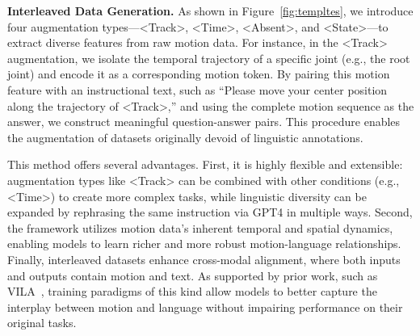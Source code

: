 

\textbf{Interleaved Data Generation. }
As shown in Figure~\ref{fig:templtes}, we introduce four augmentation types—<Track>, <Time>, <Absent>, and <State>—to extract diverse features from raw motion data. For instance, in the <Track> augmentation, we isolate the temporal trajectory of a specific joint (e.g., the root joint) and encode it as a corresponding motion token. By pairing this motion feature with an instructional text, such as “Please move your center position along the trajectory of <Track>,” and using the complete motion sequence as the answer, we construct meaningful question-answer pairs. 
This procedure enables the augmentation of datasets originally devoid of linguistic annotations.

This method offers several advantages. First, it is highly flexible and extensible: augmentation types like <Track> can be combined with other conditions (e.g., <Time>) to create more complex tasks, while linguistic diversity can be expanded by rephrasing the same instruction via GPT4 in multiple ways. Second, the framework utilizes motion data's inherent temporal and spatial dynamics, enabling models to learn richer and more robust motion-language relationships. Finally, interleaved datasets enhance cross-modal alignment, where both inputs and outputs contain motion and text. As supported by prior work, such as VILA~\cite{}, training paradigms of this kind allow models to better capture the interplay between motion and language without impairing performance on their original tasks.

